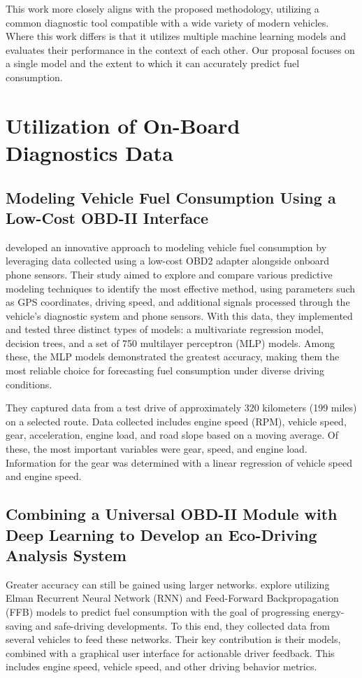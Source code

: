 \documentclass[letterpaper]{article}
\begin{document}
This work more closely aligns with the proposed methodology, utilizing
a common diagnostic tool compatible with a wide variety of modern vehicles.
Where this work differs is that it utilizes multiple machine learning models and
evaluates their performance in the context of each other. Our proposal focuses
on a single model and the extent to which it can accurately predict fuel
consumption.

\section*{Utilization of On-Board Diagnostics Data}

\subsection*{Modeling Vehicle Fuel Consumption Using a Low-Cost OBD-II Interface}

\cite{rykala2023modeling} developed an innovative approach to modeling vehicle fuel
consumption by leveraging data collected using a low-cost OBD2 adapter alongside
onboard phone sensors. Their study aimed to explore and compare various
predictive modeling techniques to identify the most effective method, using
parameters such as GPS coordinates, driving speed, and additional signals
processed through the vehicle's diagnostic system and phone sensors. With this
data, they implemented and tested three distinct types of models: a multivariate
regression model, decision trees, and a set of 750 multilayer perceptron (MLP)
models. Among these, the MLP models demonstrated the greatest accuracy, making
them the most reliable choice for forecasting fuel consumption under diverse
driving conditions. 

They captured data from a test drive of approximately 320
kilometers (199 miles) on a selected route. Data collected includes engine speed
(RPM), vehicle speed, gear, acceleration, engine load, and road slope based on a
moving average. Of these, the most important variables were gear, speed, and
engine load. Information for the gear was determined with a linear regression of
vehicle speed and engine speed.

\subsection*{Combining a Universal OBD-II Module with Deep Learning to Develop
an Eco-Driving Analysis System}

Greater accuracy can still be gained using larger networks. \cite{yen_combining_2021} 
explore utilizing Elman Recurrent Neural Network (RNN) and Feed-Forward Backpropagation
(FFB) models to predict fuel consumption with the goal of progressing
energy-saving and safe-driving developments. To this end, they collected data
from several vehicles to feed these networks. Their key contribution is their
models, combined with a graphical user interface for actionable driver feedback.
This includes engine speed, vehicle speed, and other driving behavior metrics.
\end{document}

